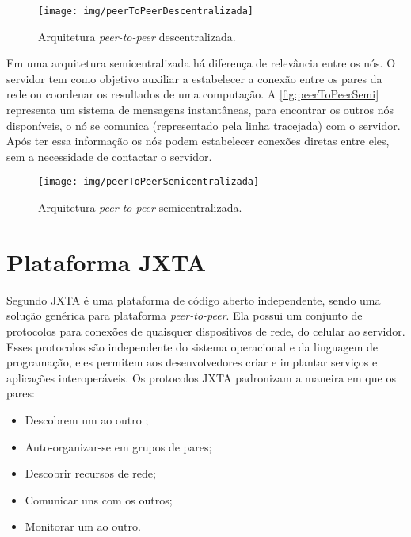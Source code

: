 \begin{figure}[htb]
	\caption{Arquitetura \textit{peer-to-peer} descentralizada.}\label{fig:peerToPeerDescentralizada}
	\begin{center}
		\texttt{[image: img/peerToPeerDescentralizada]}
	\end{center}
\end{figure}

Em uma arquitetura semicentralizada há diferença de relevância entre os nós. O servidor tem como objetivo auxiliar a estabelecer a conexão entre os pares da rede ou coordenar os resultados de uma computação. A \autoref{fig:peerToPeerSemi} representa um sistema de mensagens instantâneas, para encontrar os outros nós disponíveis, o nó se comunica (representado pela linha tracejada) com o servidor. Após ter essa informação os nós podem estabelecer conexões diretas entre eles, sem a necessidade de contactar o servidor. 
\begin{figure}[htb]
	\caption{Arquitetura \textit{peer-to-peer} semicentralizada.}\label{fig:peerToPeerSemi}
	\begin{center}
		\texttt{[image: img/peerToPeerSemicentralizada]}
	\end{center}
\end{figure}



\section{Plataforma JXTA}\label{sec:plataformaJXTA}
Segundo  JXTA é uma plataforma de código aberto independente, sendo uma solução genérica para plataforma \textit{peer-to-peer}. Ela possui um conjunto de protocolos para conexões de quaisquer dispositivos de rede, do celular ao servidor. Esses protocolos são independente do sistema operacional e da linguagem de programação, eles permitem aos desenvolvedores criar e implantar serviços e aplicações interoperáveis. Os protocolos JXTA padronizam a maneira em que os pares:
\begin{itemize}
	\item Descobrem um ao outro ;
	\item Auto-organizar-se em grupos de pares;
	\item Descobrir recursos de rede;
	\item Comunicar uns com os outros;
	\item Monitorar um ao outro.
\end{itemize}

